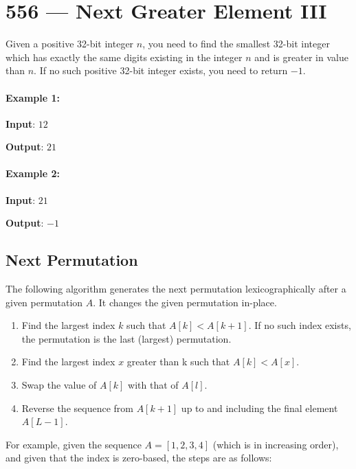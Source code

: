 \section{556 --- Next Greater Element III}
Given a positive 32-bit integer $n$, you need to find the smallest 32-bit integer which has exactly the same digits existing in the integer $n$ and is greater in value than $n$. If no such positive 32-bit integer exists, you need to return $-1$.

\paragraph{Example 1:}

\begin{flushleft}
\textbf{Input}: $12$

\textbf{Output}: $21$
\end{flushleft}

 

\paragraph{Example 2:}

\begin{flushleft}
\textbf{Input}: $21$

\textbf{Output}: $-1$
\end{flushleft}

\subsection{Next Permutation}

The following algorithm generates the next permutation lexicographically after a given permutation $A$. It changes the given permutation in-place.

\begin{enumerate}
\item Find the largest index $k$ such that $A[k] < A[k + 1]$. If no such index exists, the permutation is the last (largest) permutation.
\item Find the largest index $x$ greater than k such that $A[k] < A[x]$.
\item Swap the value of $A[k]$ with that of $A[l]$.
\item Reverse the sequence from $A[k + 1]$ up to and including the final element $A[L-1]$.
\end{enumerate}

For example, given the sequence $A = [1, 2, 3, 4]$ (which is in increasing order), and given that the index is zero-based, the steps are as follows:


